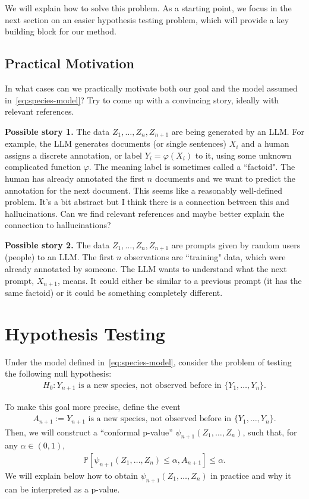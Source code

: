 \documentclass[11pt]{article}
\renewcommand{\P}[1]{\mathbb{P}\left[#1\right]}
\begin{document}
We will explain how to solve this problem. As a starting point, we focus in the next section on an easier hypothesis testing problem, which will provide a key building block for our method.

\subsection{Practical Motivation}

{\color{red}
In what cases can we practically motivate both our goal and the model assumed in~\eqref{eq:species-model}?
Try to come up with a convincing story, ideally with relevant references.

\textbf{Possible story 1.} The data $Z_1, \ldots, Z_n, Z_{n+1}$ are being generated by an LLM. For example, the LLM generates documents (or single sentences) $X_i$ and a human assigns a discrete annotation, or label $Y_i=\varphi(X_i)$ to it, using some unknown complicated function $\varphi$. 
The meaning label is sometimes called a ``factoid". 
The human has already annotated the first $n$ documents and we want to predict the annotation for the next document.
This seems like a reasonably well-defined problem. It's a bit abstract but I think there is a connection between this and hallucinations.
Can we find relevant references and maybe better explain the connection to hallucinations?


\textbf{Possible story 2.} The data $Z_1, \ldots, Z_n, Z_{n+1}$ are prompts given by random users (people) to an LLM.
The first $n$ observations are ``training" data, which were already annotated by someone. The LLM wants to understand what the next prompt, $X_{n+1}$, means. It could either be similar to a previous prompt (it has the same factoid) or it could be something completely different.


}


\section{Hypothesis Testing}

Under the model defined in~\eqref{eq:species-model}, consider the problem of testing the following null hypothesis:
\begin{align} \label{eq:H0-species}
  H_0 : Y_{n+1} \text{ is a new species, not observed before in } \{Y_1, \ldots, Y_n\}.
\end{align}

To make this goal more precise, define the event
\begin{align} \label{eq:event-A}
  A_{n+1} := Y_{n+1} \text{ is a new species, not observed before in } \{Y_1, \ldots, Y_n\}.
\end{align}
Then, we will construct a ``conformal p-value'' $\psi_{n+1}(Z_1, \ldots, Z_n)$, such that, for any $\alpha \in (0,1)$,
\begin{align} \label{eq:phi-pvalue}
  \P{\psi_{n+1}(Z_1, \ldots, Z_n) \leq \alpha, A_{n+1}} \leq \alpha.
\end{align}
We will explain below how to obtain $\psi_{n+1}(Z_1, \ldots, Z_n)$ in practice and why it can be interpreted as a p-value.
\end{document}
